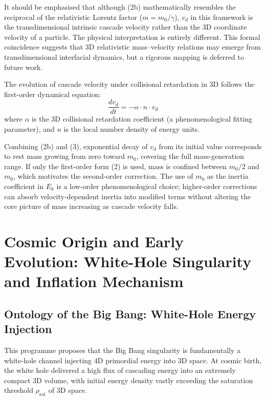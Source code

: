 \documentclass[12pt,a4paper]{article}
\begin{document}
It should be emphasised that although (2b) mathematically resembles the reciprocal of the relativistic Lorentz factor ($m=m_0/\gamma$), $v_d$ in this framework is the transdimensional intrinsic cascade velocity rather than the 3D coordinate velocity of a particle. The physical interpretation is entirely different. This formal coincidence suggests that 3D relativistic mass–velocity relations may emerge from transdimensional interfacial dynamics, but a rigorous mapping is deferred to future work.

The evolution of cascade velocity under collisional retardation in 3D follows the first-order dynamical equation:
\begin{equation}
\frac{dv_d}{dt} = -\alpha \cdot n \cdot v_d
\end{equation}
where $\alpha$ is the 3D collisional retardation coefficient (a phenomenological fitting parameter), and $n$ is the local number density of energy units.

Combining (2b) and (3), exponential decay of $v_d$ from its initial value corresponds to rest mass growing from zero toward $m_0$, covering the full mass-generation range. If only the first-order form (2) is used, mass is confined between $m_0/2$ and $m_0$, which motivates the second-order correction. The use of $m_0$ as the inertia coefficient in $E_k$ is a low-order phenomenological choice; higher-order corrections can absorb velocity-dependent inertia into modified terms without altering the core picture of mass increasing as cascade velocity falls.

\section{Cosmic Origin and Early Evolution: White-Hole Singularity and Inflation Mechanism}
\subsection{Ontology of the Big Bang: White-Hole Energy Injection}
This programme proposes that the Big Bang singularity is fundamentally a white-hole channel injecting 4D primordial energy into 3D space. At cosmic birth, the white hole delivered a high flux of cascading energy into an extremely compact 3D volume, with initial energy density vastly exceeding the saturation threshold $\rho_{\text{sat}}$ of 3D space.
\end{document}
